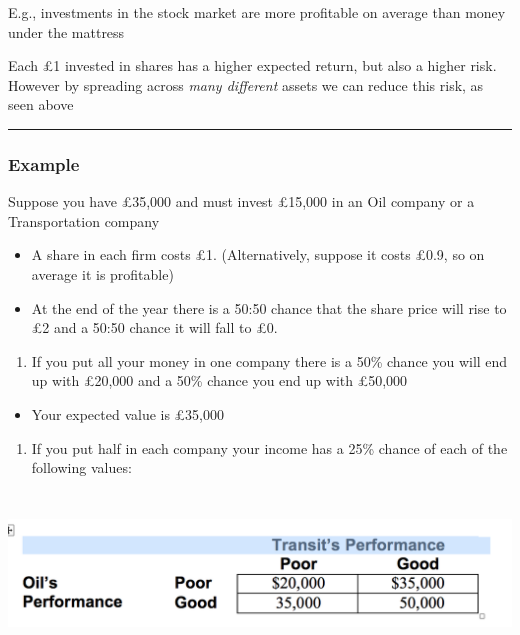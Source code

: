 \documentclass[]{article}
\providecommand{\tightlist}{%
  \setlength{\itemsep}{0pt}\setlength{\parskip}{0pt}}
\begin{document}
E.g., investments in the stock market are more profitable on average than money under the mattress

Each £1 invested in shares has a higher expected return, but also a higher risk.
However by spreading across \emph{many different} assets we can reduce this risk, as seen above

\begin{center}\rule{0.5\linewidth}{\linethickness}\end{center}

\hypertarget{example}{%
\subsubsection{Example}\label{example}}

Suppose you have \pounds35,000 and must invest \pounds15,000 in an Oil company or a Transportation company

\begin{itemize}
\item
  A share in each firm costs \pounds 1. (Alternatively, suppose it costs \pounds 0.9, so on average it is profitable)
\item
  At the end of the year there is a 50:50 chance that the share price will rise to £2 and a 50:50 chance it will fall to \pounds 0.
\end{itemize}

\begin{enumerate}
\def\labelenumi{\arabic{enumi}.}
\tightlist
\item
  If you put all your money in one company there is a 50\% chance you will end up with £20,000 and a 50\% chance you end up with \pounds 50,000
\end{enumerate}

\begin{itemize}
\tightlist
\item
  Your expected value is \pounds 35,000
\end{itemize}

\begin{enumerate}
\def\labelenumi{\arabic{enumi}.}
\setcounter{enumi}{1}
\tightlist
\item
  If you put half in each company your income has a 25\% chance of each of the following values:
\end{enumerate}

\includegraphics[height=1.7in]{picsfigs/oiltransitperformance.png}
\end{document}
